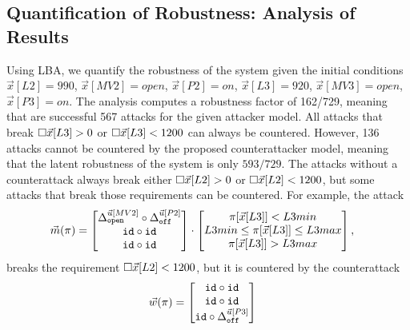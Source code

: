 {{\subsection{Quantification of Robustness: Analysis of Results}
Using LBA, we quantify the robustness of the system given the initial conditions $\vec{x}[L2]=990$, $\vec{x}[MV2]=open$, $\vec{x}[P2]=on$, $\vec{x}[L3]=920$, $\vec{x}[MV3]=open$, $\vec{x}[P3]=on$. 
The analysis computes a robustness factor of 162/729, meaning that are successful 567 attacks for the given attacker model. All attacks that break ${{\square}}{\vec{x}[L3]>0}$ or ${{\square}}{\vec{x}[L3]<1200}$ can always be countered. However, 136 attacks cannot be countered by the proposed counterattacker model, meaning that the latent robustness of the system is only $593/729$. The attacks without a counterattack always break either ${{\square}}{\vec{x}[L2]>0}$ or ${{\square}}{\vec{x}[L2]<1200}$, but some attacks that break those requirements can be countered. For example, the attack
\begin{align*}
  \vec{m}(\pi)&=
  \begin{bmatrix}
   {\Delta}^{\vec{u}[MV2]}_{\texttt{open}}\circ {\Delta}^{\vec{u}[P2]}_{\texttt{off}} \\
   {\texttt{id}}\circ {\texttt{id}} \\
   {\texttt{id}}\circ {\texttt{id}} \\
  \end{bmatrix}
  \cdot
  \begin{bmatrix}
    \pi[\vec{x}[L3]]<L3min \\
    L3min \leq \pi[\vec{x}[L3]]\leq L3max \\
    \pi[\vec{x}[L3]]>L3max
  \end{bmatrix},
\end{align*} 
breaks the requirement ${{\square}}{\vec{x}[L2]<1200}$, but it is countered by the counterattack 
\begin{align*}
  \vec{w}(\pi)&=
  \begin{bmatrix}
    {\texttt{id}}\circ {\texttt{id}} \\
    {\texttt{id}}\circ {\texttt{id}} \\
    {\texttt{id}}\circ {\Delta}^{\vec{u}[P3]}_{\texttt{off}} \\

\end{bmatrix}
\end{align*}}}
